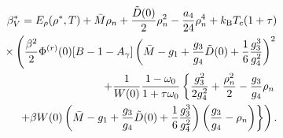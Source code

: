 \begin{eqnarray}
	&& \beta^*_V  =  E_\rho (\rho^*,T) + \bar{M} \rho_{n} + \frac{\tilde D(0)}{2} \rho_{n}^2 - \frac{a_4}{24} \rho_{n}^4 + k_{\rm B} T_c (1+\tau)
	\nonumber\\
	&& \times \left( \frac{\beta^2}{2}  \Phi^{(r)}(0) [B - 1 - A_\gamma]	\left(\bar{M} - g_1+ \frac{g_3}{g_4} \tilde D(0) + \frac{1}{6} \frac{g_3^3}{g_4^2} \right)^2 \right . \nonumber \\
	&& \left . + \frac{1}{W(0)} \frac{1 - \omega_0}{1 + \tau \omega_0} \left\{ \frac{g_3^2}{2 g_4^2} + \frac{\rho_n^2}{2} - \frac{g_3}{g_4} \rho_n  \right . \right . \nonumber \\
	&& \left . \left . + \beta W(0) \left( \bar{M} - g_1+ \frac{g_3}{g_4} \tilde D(0) + \frac{1}{6} \frac{g_3^3}{g_4^2} \right) \left( \frac{g_3}{g_4} - \rho_n \right)    \right\} \right).
\end{eqnarray}

